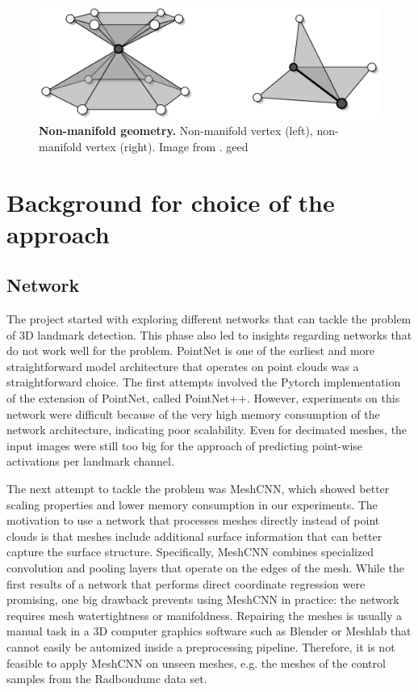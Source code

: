 \documentclass[class=article, crop=false]{standalone}
\begin{document}
    
\vspace{0.05\linewidth}

\begin{figure}[h]
    \centering
    \includegraphics[width=0.4\linewidth]{thesis/appendices/import/imgs/non-manif-e-v.png}
    \caption{\textbf{Non-manifold geometry.}
\small Non-manifold vertex (left), non-manifold vertex (right). Image from \cite{Botsch2010}.
geed}
    \label{fig:non-manif-e-v}
\end{figure}
\vspace{0.05\linewidth}
    


\section{Background for choice of the approach}
\label{sec:app_approach_choice}
\subsection{Network}
The project started with exploring different networks that can tackle the problem of 3D landmark detection. This phase also led to insights regarding networks that do not work well for the problem. PointNet is one of the earliest and more straightforward model architecture that operates on point clouds was a straightforward choice. The first attempts involved the Pytorch implementation of the extension of PointNet, called PointNet++. However, experiments on this network were difficult because of the very high memory consumption of the network architecture, indicating poor scalability. Even for decimated meshes, the input images were still too big for the approach of predicting point-wise activations per landmark channel.

The next attempt to tackle the problem was MeshCNN, which showed better scaling properties and lower memory consumption in our experiments. The motivation to use a network that processes meshes directly instead of point clouds is that meshes include additional surface information that can better capture the surface structure. Specifically, MeshCNN combines specialized convolution and pooling layers that operate on the edges of the mesh. While the first results of a network that performs direct coordinate regression were promising, one big drawback prevents using MeshCNN in practice: the network requires mesh watertightness or manifoldness. Repairing the meshes is usually a manual task in a 3D computer graphics software such as Blender \cite{blender} or Meshlab \cite{meshlab} that cannot easily be automized inside a preprocessing pipeline. Therefore, it is not feasible to apply MeshCNN on unseen meshes, e.g. the meshes of the control samples from the Radboudumc data set.
\end{document}
